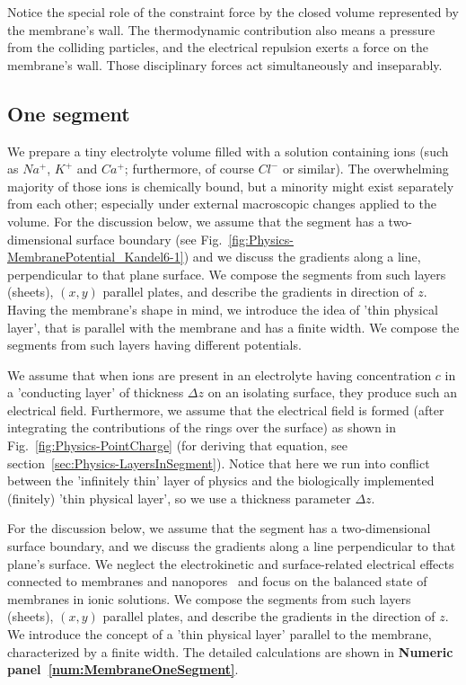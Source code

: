 Notice the special role of the constraint force by the closed volume represented by the membrane's wall. 
The thermodynamic contribution also means a pressure from the colliding particles, and the electrical repulsion exerts a force on the membrane's wall. Those disciplinary forces act simultaneously and inseparably. 
\else

\fi


\ifx\magyar\undefined
\subsection{One segment\label{sec:Physics-OneSegment}}


We prepare a tiny electrolyte volume filled with a solution containing
ions (such as $Na^+$, $K^+$ and $Ca^+$; furthermore, of course $Cl^-$ or similar). The overwhelming majority of those ions 
is chemically bound, but a minority might exist separately from each other; especially under external macroscopic changes  applied to the volume.  
For the discussion below, we assume that the segment has a two-dimensional surface boundary (see Fig.~\ref{fig:Physics-MembranePotential_Kandel6-1}) and we discuss the gradients along a line, perpendicular
to that plane surface.
We compose the segments from such layers (sheets), $(x,y)$ 
parallel plates, and describe the gradients in direction of $z$.
Having the membrane's shape in mind, we introduce the idea of 'thin physical layer', that is parallel with the membrane and has a finite width. 
We compose the segments from such layers having different potentials.


We assume that when ions are present in an electrolyte having concentration $c$ 
in a 'conducting layer' of thickness $\Delta z$ on an isolating surface, they produce such an electrical field. Furthermore, we assume
that the electrical field is formed (after integrating the contributions of the rings over the surface) as shown in Fig.~\ref{fig:Physics-PointCharge}
(for deriving that equation, see section~\ref{sec:Physics-LayersInSegment}).
Notice that here we run into conflict between the 'infinitely thin'
layer of physics and the biologically implemented 
(finitely) 'thin physical layer', so we use a thickness parameter $\Delta z$.
\else

\fi


\ifx\magyar\undefined
For the discussion below, we assume that the segment has a two-dimensional surface boundary, and we discuss the gradients along a line perpendicular
to that plane's surface.
We neglect the electrokinetic and surface-related electrical effects connected to membranes and nanopores~\cite{OriginMembranePotential:2018} and focus
on the balanced state of membranes in ionic solutions.
We compose the segments from such layers (sheets), $(x,y)$ 
parallel plates, and describe the gradients in the direction of $z$.
We introduce the concept of a 'thin physical layer' parallel to the membrane, characterized by a finite width. The detailed calculations are shown in \textbf{Numeric panel~\ref{num:MembraneOneSegment}}.

